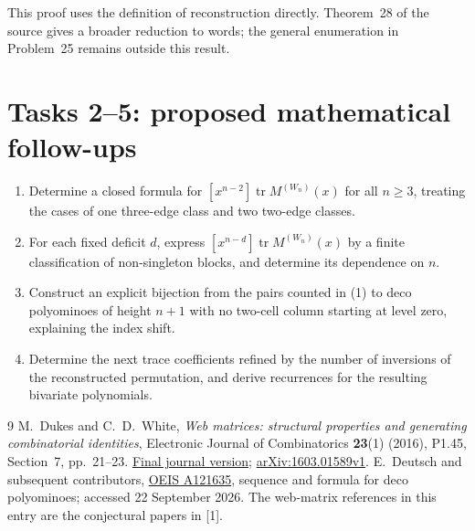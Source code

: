 \documentclass[11pt]{article}
\newcommand{\tr}{\operatorname{tr}}
\begin{document}
This proof uses the definition of reconstruction directly.
Theorem~28 of the source gives a broader reduction to words;
the general enumeration in Problem~25 remains outside this result.

\section*{Tasks 2--5: proposed mathematical follow-ups}
\begin{enumerate}[label=\textbf{Task \arabic*:},start=2,leftmargin=*]
\item Determine a closed formula for \([x^{n-2}]\tr M^{(W_n)}(x)\)
for all \(n\geq3\), treating the cases of one three-edge class
and two two-edge classes.
\item For each fixed deficit \(d\), express
\([x^{n-d}]\tr M^{(W_n)}(x)\) by a finite classification of
non-singleton blocks, and determine its dependence on \(n\).
\item Construct an explicit bijection from the pairs counted
in (1) to deco polyominoes of height \(n+1\) with no two-cell
column starting at level zero, explaining the index shift.
\item Determine the next trace coefficients refined by the
number of inversions of the reconstructed permutation, and
derive recurrences for the resulting bivariate polynomials.
\end{enumerate}

\begin{thebibliography}{9}
M.~Dukes and C.~D.~White, \emph{Web matrices: structural properties
and generating combinatorial identities},
Electronic Journal of Combinatorics \textbf{23}(1) (2016), P1.45,
Section~7, pp.~21--23.
\href{https://emis.de/ft/29232}{Final journal version};
\href{https://arxiv.org/abs/1603.01589}{arXiv:1603.01589v1}.
E.~Deutsch and subsequent contributors,
\href{https://oeis.org/A121635}{OEIS A121635},
sequence and formula for deco polyominoes; accessed
22 September 2026. The web-matrix references in this entry
are the conjectural papers in [1].
\end{thebibliography}
\end{document}
